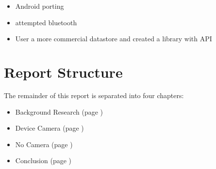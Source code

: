 \begin{itemize}
\item Android porting
\item attempted bluetooth
\item User a more commercial datastore and created a library with API
\end{itemize}

\section{Report Structure}

The remainder of this report is separated into four chapters:
\begin{itemize}
\item Background Research (page \pageref{ch:background})
\item Device Camera (page \pageref{ch:devcamera})
\item No Camera (page \pageref{ch:no_camera})
\item Conclusion (page \pageref{ch:conclusions})
\end{itemize}

